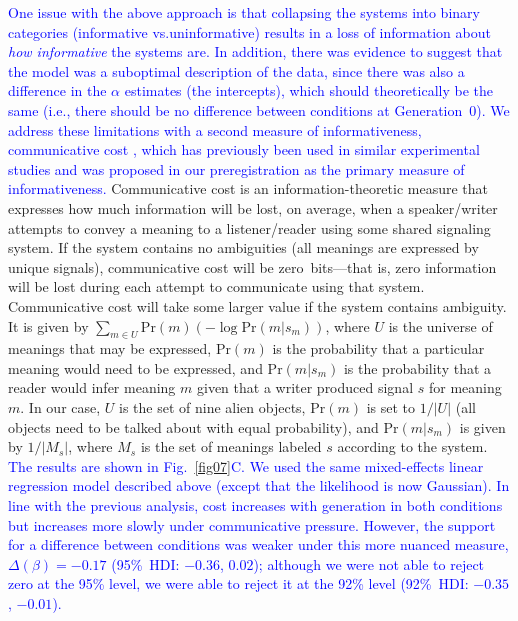 \documentclass[doc,biblatex]{apa7}
\newcommand\newmaterial[1]{\textcolor{blue}{#1}}
\begin{document}
\newmaterial{One issue with the above approach is that collapsing the systems into binary categories (informative vs.\@ uninformative) results in a loss of information about \textit{how informative} the systems are. In addition, there was evidence to suggest that the model was a suboptimal description of the data, since there was also a difference in the $\alpha$ estimates (the intercepts), which should theoretically be the same (i.e., there should be no difference between conditions at Generation~0). We address these limitations with a second measure of informativeness, communicative cost \parencite{KempRegier:2012, Kemp:2018, Regier:2015}, which has previously been used in similar experimental studies \parencite{Carr:2020, Carstensen:2015, Smith:2020} and was proposed in our preregistration as the primary measure of informativeness.} Communicative cost is an information-theoretic measure that expresses how much information will be lost, on average, when a speaker/writer attempts to convey a meaning to a listener/reader using some shared signaling system. If the system contains no ambiguities (all meanings are expressed by unique signals), communicative cost will be zero~bits---that is, zero information will be lost during each attempt to communicate using that system. Communicative cost will take some larger value if the system contains ambiguity. It is given by $\sum_{m \in U} \mathrm{Pr}(m) ( -\log \mathrm{Pr}(m|s_m) )$, where $U$ is the universe of meanings that may be expressed, $\mathrm{Pr}(m)$ is the probability that a particular meaning would need to be expressed, and $\mathrm{Pr}(m|s_m)$ is the probability that a reader would infer meaning $m$ given that a writer produced signal $s$ for meaning $m$. In our case, $U$ is the set of nine alien objects, $\mathrm{Pr}(m)$ is set to $1/|U|$ (all objects need to be talked about with equal probability), and $\mathrm{Pr}(m|s_m)$ is given by $1/|M_s|$, where $M_s$ is the set of meanings labeled $s$ according to the system. \newmaterial{The results are shown in Fig.~\ref{fig07}C. We used the same mixed-effects linear regression model described above (except that the likelihood is now Gaussian). In line with the previous analysis, cost increases with generation in both conditions but increases more slowly under communicative pressure. However, the support for a difference between conditions was weaker under this more nuanced measure, $\Delta(\beta) = -0.17$ (95\%~HDI: $-0.36$, $0.02$); although we were not able to reject zero at the 95\% level, we were able to reject it at the 92\% level (92\%~HDI: $-0.35$, $-0.01$).}
\end{document}
